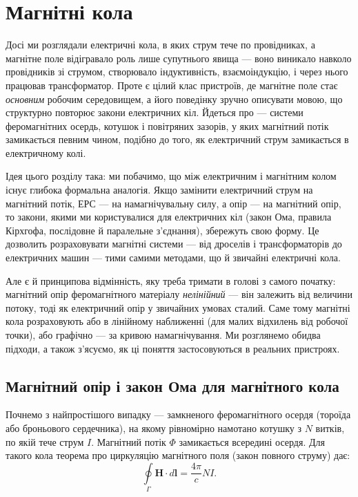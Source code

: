 \documentclass[]{ConspectBook}
\begin{document}
\chapter{Магнітні кола}\label{\currfilebase}
\graphicspath{{\currfilebase/Pictures}}

Досі ми розглядали електричні кола, в яких струм тече по провідниках, а магнітне поле відігравало роль лише супутнього явища --- воно виникало навколо провідників зі струмом, створювало індуктивність, взаємоіндукцію, і через нього працював трансформатор. Проте є цілий клас пристроїв, де магнітне поле стає \emph{основним} робочим середовищем, а його поведінку зручно описувати мовою, що структурно повторює закони електричних кіл. Йдеться про  --- системи феромагнітних осердь, котушок і повітряних зазорів, у яких магнітний потік замикається певним чином, подібно до того, як електричний струм замикається в електричному колі.

Ідея цього розділу така: ми побачимо, що між електричним і магнітним колом існує глибока формальна аналогія. Якщо замінити електричний струм на магнітний потік, ЕРС --- на намагнічувальну силу, а опір --- на магнітний опір, то закони, якими ми користувалися для електричних кіл (закон Ома, правила Кірхгофа, послідовне й паралельне з'єднання), збережуть свою форму. Це дозволить розраховувати магнітні системи --- від дроселів і трансформаторів до електричних машин --- тими самими методами, що й звичайні електричні кола.

Але є й принципова відмінність, яку треба тримати в голові з самого початку: магнітний опір феромагнітного матеріалу \emph{нелінійний} --- він залежить від величини потоку, тоді як електричний опір у звичайних умовах сталий. Саме тому магнітні кола розраховують або в лінійному наближенні (для малих відхилень від робочої точки), або графічно --- за кривою намагнічування. Ми розглянемо обидва підходи, а також з'ясуємо, як ці поняття застосовуються в реальних пристроях.

\section{Магнітний опір і закон Ома для магнітного кола}

Почнемо з найпростішого випадку --- замкненого феромагнітного осердя (тороїда або броньового сердечника), на якому рівномірно намотано котушку з $N$ витків, по якій тече струм $I$. Магнітний потік $\Phi$ замикається всередині осердя. Для такого кола теорема про циркуляцію магнітного поля (закон повного струму) дає:
\begin{equation}\label{eq:Ampere_law_magnetic}
	\oint\limits_{\Gamma} \mathbf{H} \cdot d\mathbf{l} = \frac{4\pi}{c} N I.
\end{equation}
\end{document}

